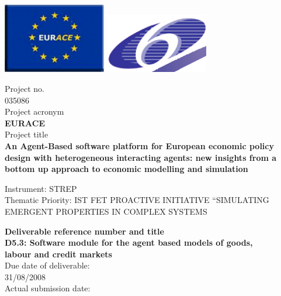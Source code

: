 \documentclass[a4paper,11pt]{article}
\begin{document}
\thispagestyle{empty}

\vspace{\baselineskip}
\includegraphics[width=45mm]{EURACE-logo.png} \hfill
\includegraphics[width=45mm]{FW6-logo.png}

\begin{center}
Project no.\\
035086\\
Project acronym\\
{\bf EURACE}\\
Project title\\
{\bf An Agent-Based software platform for European economic policy design with heterogeneous interacting agents: new insights from a bottom up approach to economic modelling and simulation}\\
\end{center}

\vspace*{\baselineskip}\noindent
Instrument: STREP\\[\baselineskip]
Thematic Priority: IST FET PROACTIVE INITIATIVE ``SIMULATING EMERGENT PROPERTIES IN COMPLEX SYSTEMS\\

\vspace*{2\baselineskip}
\begin{center}
{\bf
Deliverable reference number and title\\
D5.3: Software module for the agent based models of goods,\\
labour and credit
markets\\ }
Due date of deliverable:\\
31/08/2008\\
Actual submission date:\\
\end{center}
\end{document}
